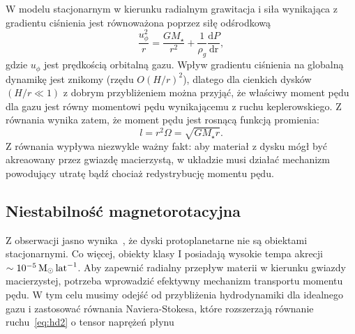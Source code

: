 %
\par W modelu stacjonarnym w kierunku radialnym grawitacja i siła wynikająca z
gradientu ciśnienia jest równoważona poprzez siłę odśrodkową
\begin{equation}\label{eq:radial_balance}
\frac{u_\phi^2}{r} = \frac{GM_\star}{r^2} +
  \frac{1}{\rho_g}\frac{\textrm{d}P}{\textrm{dr}},
\end{equation}
gdzie $u_\phi$ jest prędkością orbitalną gazu. Wpływ gradientu ciśnienia na
globalną dynamikę jest znikomy (rzędu $O(H/r)^2$), dlatego dla cienkich dysków
$(H/r \ll 1)$ z dobrym przybliżeniem można przyjąć, że właściwy moment pędu dla
gazu jest równy momentowi pędu wynikającemu z ruchu keplerowskiego. Z równania
 wynika zatem, że moment pędu jest rosnącą funkcją
promienia:
\begin{equation}\label{eq:angmom}
l = r^2\Omega = \sqrt{GM_\star r}.
\end{equation}
Z równania  wypływa niezwykle ważny fakt: aby materiał z dysku
mógł być akreaowany przez gwiazdę macierzystą, w układzie musi działać mechanizm
powodujący utratę bądź chociaż redystrybucję momentu pędu.
\subsection{Niestabilność magnetorotacyjna}
Z obserwacji jasno wynika~\citep{MME04}, że dyski
protoplanetarne nie są obiektami stacjonarnymi. Co więcej, obiekty klasy I
posiadają wysokie tempa akrecji $\sim 10^{-5}\hbox{$\mathrm{\thinspace M_{\odot}}$}\hbox{$\thinspace\textrm{lat}$}^{-1}$. Aby zapewnić
radialny przepływ materii w kierunku gwiazdy macierzystej, potrzeba wprowadzić
efektywny mechanizm transportu momentu pędu. W tym celu musimy odejść od
przybliżenia hydrodynamiki dla idealnego gazu i zastosować równania
Naviera-Stokesa, które rozszerzają równanie ruchu~\ref{eq:hd2} o tensor naprężeń
płynu

